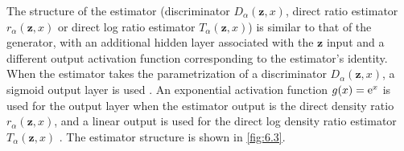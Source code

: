 \documentclass[honours,12pt, twoside]{unswthesis}
\numberwithin{equation}{section}
\theoremstyle{definition}
\begin{document}
The structure of the estimator (discriminator $D_\alpha(\bm{z},x)$, direct ratio estimator $r_\alpha(\bm{z},x)$ or direct log ratio estimator $T_\alpha(\bm{z},x)$) is similar to that of the generator, with an additional hidden layer associated with the $\bm{z}$ input and a different output activation function corresponding to the estimator's identity. When the estimator takes the parametrization of a discriminator $D_\alpha(\bm{z},x)$, a sigmoid output layer is used \citep{gan}. An exponential activation function $g(x)={\rm e}^x$ is used for the output layer when the estimator output is the direct density ratio $r_\alpha(\bm{z},x)$, and a linear output is used for the direct log density ratio estimator $T_\alpha(\bm{z},x)$ \citep{nowozin}. The estimator structure is shown in \autoref{fig:6.3}.
\begin{figure}[h!]

\end{figure}
\end{document}
